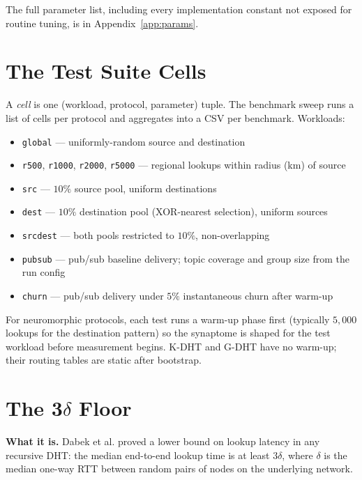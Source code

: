 \documentclass[twoside,nobib]{tufte-book}
\newcommand{\KDHT}{K-DHT\xspace}
\newcommand{\GDHT}{G-DHT\xspace}
\begin{document}
The full parameter list, including every implementation constant
not exposed for routine tuning, is in
Appendix~\ref{app:params}.

\section{The Test Suite Cells}

A \emph{cell} is one (workload, protocol, parameter) tuple. The
benchmark sweep runs a list of cells per protocol and aggregates
into a CSV per benchmark. Workloads:

\begin{itemize}\setlength\itemsep{0.1em}
  \item \texttt{global} --- uniformly-random source and
    destination
  \item \texttt{r500}, \texttt{r1000}, \texttt{r2000},
    \texttt{r5000} --- regional lookups within radius (km) of source
  \item \texttt{src} --- $10\%$ source pool, uniform destinations
  \item \texttt{dest} --- $10\%$ destination pool (XOR-nearest
    selection), uniform sources
  \item \texttt{srcdest} --- both pools restricted to $10\%$,
    non-overlapping
  \item \texttt{pubsub} --- pub/sub baseline delivery; topic
    coverage and group size from the run config
  \item \texttt{churn} --- pub/sub delivery under $5\%$
    instantaneous churn after warm-up
\end{itemize}

For neuromorphic protocols, each test runs a warm-up phase first
(typically $5{,}000$ lookups for the destination pattern) so the
synaptome is shaped for the test workload before measurement
begins. \KDHT and \GDHT have no warm-up; their routing tables are
static after bootstrap.

\section{The 3\boldmath$\delta$ Floor}
\label{sec:eval-floor}

\textbf{What it is.} Dabek et al. proved a lower bound on lookup
latency in any recursive DHT: the median end-to-end lookup time
is at least $3\delta$, where $\delta$ is the median one-way RTT
between random pairs of nodes on the underlying network.
\end{document}
